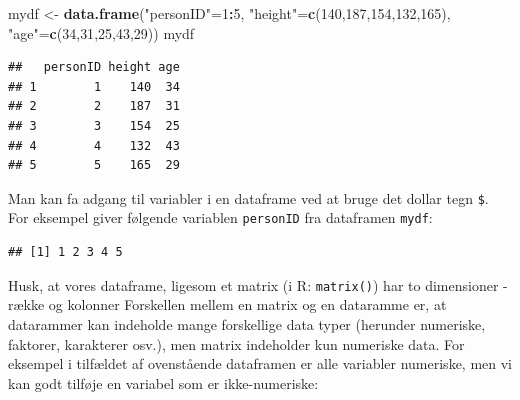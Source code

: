\documentclass[
]{book}
\newenvironment{Shaded}{\begin{snugshade}}{\end{snugshade}}
\newcommand{\CommentTok}[1]{\textcolor[rgb]{0.56,0.35,0.01}{\textit{#1}}}
\newcommand{\DecValTok}[1]{\textcolor[rgb]{0.00,0.00,0.81}{#1}}
\newcommand{\FunctionTok}[1]{\textcolor[rgb]{0.13,0.29,0.53}{\textbf{#1}}}
\newcommand{\NormalTok}[1]{#1}
\newcommand{\OtherTok}[1]{\textcolor[rgb]{0.56,0.35,0.01}{#1}}
\newcommand{\SpecialCharTok}[1]{\textcolor[rgb]{0.81,0.36,0.00}{\textbf{#1}}}
\newcommand{\StringTok}[1]{\textcolor[rgb]{0.31,0.60,0.02}{#1}}
\theoremstyle{definition}
\theoremstyle{definition}
\theoremstyle{definition}
\theoremstyle{definition}
\theoremstyle{remark}
\begin{document}
\begin{Shaded}
\begin{Highlighting}[]
\NormalTok{mydf }\OtherTok{\textless{}{-}} \FunctionTok{data.frame}\NormalTok{(}\StringTok{"personID"}\OtherTok{=}\DecValTok{1}\SpecialCharTok{:}\DecValTok{5}\NormalTok{, }\StringTok{"height"}\OtherTok{=}\FunctionTok{c}\NormalTok{(}\DecValTok{140}\NormalTok{,}\DecValTok{187}\NormalTok{,}\DecValTok{154}\NormalTok{,}\DecValTok{132}\NormalTok{,}\DecValTok{165}\NormalTok{), }\StringTok{"age"}\OtherTok{=}\FunctionTok{c}\NormalTok{(}\DecValTok{34}\NormalTok{,}\DecValTok{31}\NormalTok{,}\DecValTok{25}\NormalTok{,}\DecValTok{43}\NormalTok{,}\DecValTok{29}\NormalTok{))}
\NormalTok{mydf}
\end{Highlighting}
\end{Shaded}

\begin{verbatim}
##   personID height age
## 1        1    140  34
## 2        2    187  31
## 3        3    154  25
## 4        4    132  43
## 5        5    165  29
\end{verbatim}

Man kan fa adgang til variabler i en dataframe ved at bruge det dollar tegn \texttt{\$}. For eksempel giver følgende variablen \texttt{personID} fra dataframen \texttt{mydf}:

\begin{Shaded}
\end{Shaded}

\begin{verbatim}
## [1] 1 2 3 4 5
\end{verbatim}

Husk, at vores dataframe, ligesom et matrix (i R: \texttt{matrix()}) har to dimensioner - række og kolonner Forskellen mellem en matrix og en dataramme er, at datarammer kan indeholde mange forskellige data typer (herunder numeriske, faktorer, karakterer osv.), men matrix indeholder kun numeriske data. For eksempel i tilfældet af ovenstående dataframen er alle variabler numeriske, men vi kan godt tilføje en variabel som er ikke-numeriske:

\begin{Shaded}
\end{Shaded}
\end{document}
